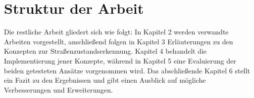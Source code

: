 \section{Struktur der Arbeit}

Die restliche Arbeit gliedert sich wie folgt: In Kapitel 2 werden verwandte Arbeiten vorgestellt, anschließend folgen in Kapitel 3 Erläuterungen zu den Konzepten zur Straßenzustandserkennung. Kapitel 4 behandelt die Implementierung jener Konzepte, während in Kapitel 5 eine Evaluierung der beiden getesteten Ansätze vorgenommen wird. Das abschließende Kapitel 6 stellt ein Fazit zu den Ergebnissen und gibt einen Ausblick auf mögliche Verbesserungen und Erweiterungen.